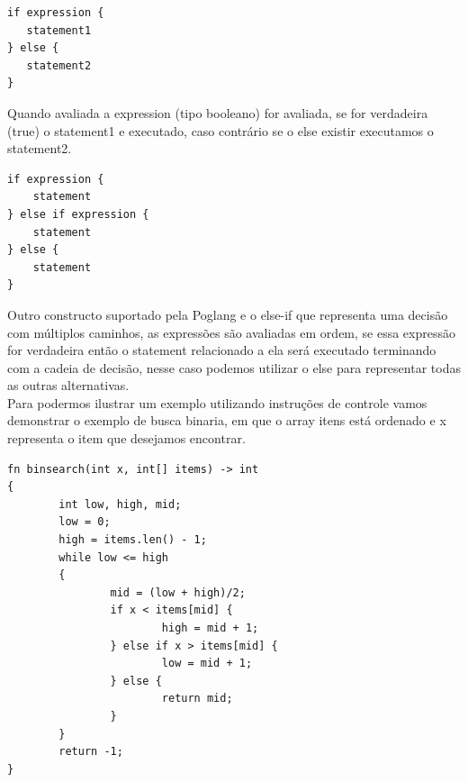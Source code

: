 \documentclass[12pt, letterpaper]{article}
\newcommand\tab[1][1cm]{\hspace*{#1}}
\begin{document}
\begin{spacing}{1.5}
\end{spacing}

\begin{lstlisting}[caption=Forma geral if-else]
if expression {
   statement1
} else {
   statement2
}
\end{lstlisting}

\begin{spacing}{1.5}
\end{spacing}

\tab Quando avaliada a expression (tipo booleano) for avaliada, se for verdadeira (true) o statement1 
e executado, caso contrário se o else existir executamos o statement2.

\begin{spacing}{1.5}
\end{spacing}

\begin{lstlisting}[caption=Forma Geral de múltiplos if-else]
if expression {
    statement
} else if expression {
    statement
} else {
    statement
}
\end{lstlisting}

\begin{spacing}{1.5}
\end{spacing}
 
\tab Outro constructo suportado pela Poglang e o else-if que representa uma 
decisão com múltiplos caminhos, as expressões são avaliadas em ordem, se
essa expressão for verdadeira então o statement relacionado a ela será 
executado terminando com a cadeia de decisão, nesse caso podemos utilizar 
o else para representar todas as outras alternativas.\\[1.0mm]

\tab Para podermos ilustrar um exemplo utilizando instruções de controle vamos 
demonstrar o exemplo de busca binaria, em que o array itens está ordenado
e x representa o item que desejamos encontrar.

\begin{spacing}{1.5}
\end{spacing}

\begin{lstlisting}[caption=Exemplo if-else]
fn binsearch(int x, int[] items) -> int 
{
        int low, high, mid;
        low = 0;
        high = items.len() - 1;
        while low <= high
        {
                mid = (low + high)/2;
                if x < items[mid] {
                        high = mid + 1;
                } else if x > items[mid] {
                        low = mid + 1;
                } else {
                        return mid;
                }
        }
        return -1;
}
\end{lstlisting}
\end{document}

